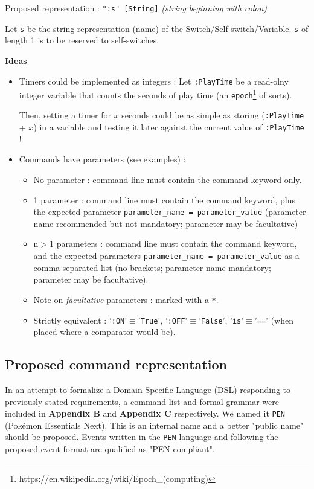 \documentclass[11pt]{article}
\begin{document}
{Proposed representation : \verb|":s" [String]| \textit{(string beginning with colon)}

Let \verb|s| be the string representation (name) of the Switch/Self-switch/Variable. \verb|s| of length 1 is to be reserved to self-switches.


\textbf{Ideas}
\begin{itemize}
	\item Timers could be implemented as integers : Let \verb|:PlayTime| be a read-olny integer variable that counts the seconds of play time (an \texttt{epoch}\footnote{https://en.wikipedia.org/wiki/Epoch\_(computing)} of sorts).
	
	Then, setting a timer for $x$ seconds could be as simple as storing (\verb|:PlayTime| + $x$) in a variable and testing it later against the current value of \verb|:PlayTime| !
	
	\item Commands have parameters (see examples) :
	\begin{itemize}
		\item No parameter : command line must contain the command keyword only.
		\item 1 parameter : command line must contain the command keyword, plus the expected parameter \verb|parameter_name = parameter_value| (parameter name recommended but not mandatory; parameter may be facultative)
		\item n$>$1 parameters : command line must contain the command keyword, and the expected parameters \verb|parameter_name = parameter_value| as a comma-separated list (no brackets; parameter name mandatory; parameter may be facultative).
		\item Note on \textit{facultative} parameters : marked with a \verb|*|.
		\item Strictly equivalent : '\verb|:ON|'$\equiv$'\verb|True|', '\verb|:OFF|'$\equiv$'\verb|False|', '\verb|is|'$\equiv$'\verb|==|' (when placed where a comparator would be).
	\end{itemize}
\end{itemize}


\subsection{Proposed command representation}

In an attempt to formalize a Domain Specific Language (DSL) responding to previously stated requirements, a command list and formal grammar were included in \textbf{Appendix B} and \textbf{Appendix C} respectively. We named it \texttt{PEN} (Pokémon Essentials Next). This is an internal name and a better "public name" should be proposed. Events written in the \texttt{PEN} language and following the proposed event format are qualified as "PEN compliant".

}
\end{document}
